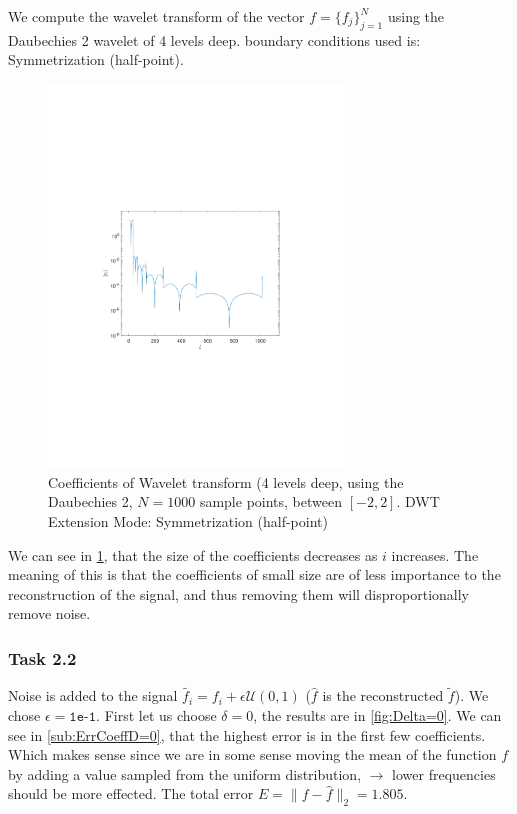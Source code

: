 \documentclass[a4paper]{article}
\begin{document}
    We compute the wavelet transform of the vector $f = \{f_j\}_{j=1}^N$ using the Daubechies 2 wavelet of 4 levels deep. boundary conditions used is: Symmetrization (half-point). 
    \begin{figure}[H]
	\centering
	\includegraphics[trim={3.5cm 8cm 4cm 9cm},clip,width=0.7\textwidth]{Images/Coefficents.pdf}
	\caption{Coefficients of Wavelet transform (4 levels deep, using the Daubechies 2, $N=1000$ sample points, between $[-2,2]$. DWT Extension Mode: Symmetrization (half-point)}
	\label{fig:Coeff}
    \end{figure}

    We can see in \cref{fig:Coeff}, that the size of the coefficients decreases as $i$ increases. The meaning of this is that the coefficients of small size are of less importance to the reconstruction of the signal, and thus removing them will disproportionally remove noise.

    \subsubsection{Task 2.2}

	Noise is added to the signal $\tilde{f_i} = f_i + \epsilon \mathcal{U}(0,1)$ ($\hat{f}$ is the reconstructed $\tilde{f}$). We chose $\epsilon = \texttt{1e-1}$. First let us choose $\delta = 0$, the results are in \cref{fig:Delta=0}. We can see in \cref{sub:ErrCoeffD=0}, that the highest error is in the first few coefficients. Which makes sense since we are in some sense moving the mean of the function $f$ by adding a value sampled from the uniform distribution, $\rightarrow$ lower frequencies should be more effected. The total error $E = \|f-\hat{f}\|_2 = 1.805$.\\
	
\end{document}
